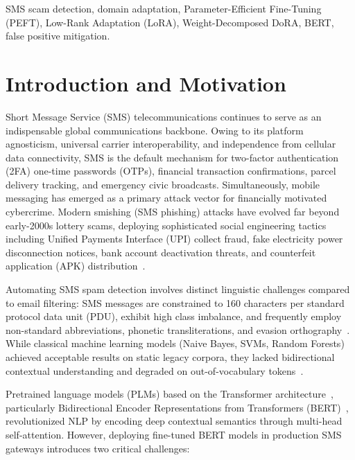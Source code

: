 \documentclass[conference]{IEEEtran}
\begin{document}
\begin{IEEEkeywords}
SMS scam detection, domain adaptation, Parameter-Efficient Fine-Tuning (PEFT), Low-Rank Adaptation (LoRA), Weight-Decomposed DoRA, BERT, false positive mitigation.
\end{IEEEkeywords}

\section{Introduction and Motivation}
\label{sec:intro}

Short Message Service (SMS) telecommunications continues to serve as an indispensable global communications backbone. Owing to its platform agnosticism, universal carrier interoperability, and independence from cellular data connectivity, SMS is the default mechanism for two-factor authentication (2FA) one-time passwords (OTPs), financial transaction confirmations, parcel delivery tracking, and emergency civic broadcasts. Simultaneously, mobile messaging has emerged as a primary attack vector for financially motivated cybercrime. Modern smishing (SMS phishing) attacks have evolved far beyond early-2000s lottery scams, deploying sophisticated social engineering tactics including Unified Payments Interface (UPI) collect fraud, fake electricity power disconnection notices, bank account deactivation threats, and counterfeit application (APK) distribution~\cite{almeida2011sms,trai2018tcccpr}.

Automating SMS spam detection involves distinct linguistic challenges compared to email filtering: SMS messages are constrained to 160 characters per standard protocol data unit (PDU), exhibit high class imbalance, and frequently employ non-standard abbreviations, phonetic transliterations, and evasion orthography~\cite{delany2012sms}. While classical machine learning models (Naive Bayes, SVMs, Random Forests) achieved acceptable results on static legacy corpora, they lacked bidirectional contextual understanding and degraded on out-of-vocabulary tokens~\cite{almeida2011sms}.

Pretrained language models (PLMs) based on the Transformer architecture~\cite{vaswani2017attention}, particularly Bidirectional Encoder Representations from Transformers (BERT)~\cite{devlin2019bert}, revolutionized NLP by encoding deep contextual semantics through multi-head self-attention. However, deploying fine-tuned BERT models in production SMS gateways introduces two critical challenges:
\end{document}
